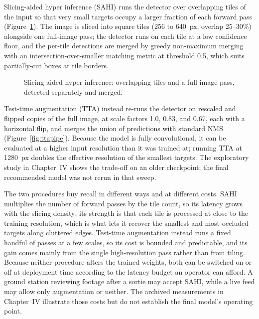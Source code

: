 \documentclass[12pt,a4paper,oneside]{report}
\begin{document}
Slicing-aided hyper inference (SAHI) runs the detector over overlapping tiles of
the input so that very small targets occupy a larger fraction of each forward
pass (Figure~\ref{fig:sahipipe}). The image is sliced into square tiles (256 to
640~px, overlap 25--30\%) alongside one full-image pass; the detector runs on
each tile at a low confidence floor, and the per-tile detections are merged by
greedy non-maximum merging with an intersection-over-smaller matching metric at
threshold 0.5, which suits partially-cut boxes at tile borders.

\begin{figure}[tbp]
  \centering
  \caption[Slicing-aided hyper inference.]{Slicing-aided hyper inference:
  overlapping tiles and a full-image pass, detected separately and merged.}
  \label{fig:sahipipe}
\end{figure}

Test-time augmentation (TTA) instead re-runs the detector on rescaled and
flipped copies of the full image, at scale factors 1.0, 0.83, and 0.67, each
with a horizontal flip, and merges the union of predictions with standard NMS
(Figure~\ref{fig:ttapipe}). Because the model is fully convolutional, it can be
evaluated at a higher input resolution than it was trained at; running TTA at
1280~px doubles the effective resolution of the smallest targets. The
exploratory study in Chapter~IV shows the trade-off on an older checkpoint;
the final recommended model was not rerun in that sweep.

The two procedures buy recall in different ways and at different costs. SAHI
multiplies the number of forward passes by the tile count, so its latency grows
with the slicing density; its strength is that each tile is processed at close
to the training resolution, which is what lets it recover the smallest and most
occluded targets along cluttered edges. Test-time augmentation instead runs a
fixed handful of passes at a few scales, so its cost is bounded and predictable,
and its gain comes mainly from the single high-resolution pass rather than from
tiling. Because neither procedure alters the trained weights, both can be
switched on or off at deployment time according to the latency budget an
operator can afford. A ground station reviewing footage after a sortie may
accept SAHI, while a live feed may allow only augmentation or neither. The
archived measurements in Chapter~IV illustrate those costs but do not establish
the final model's operating point.
\end{document}
